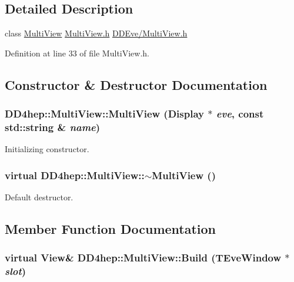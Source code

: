 \subsection{Detailed Description}
class \hyperlink{class_d_d4hep_1_1_multi_view}{MultiView} \hyperlink{_multi_view_8h}{MultiView.h} \hyperlink{_multi_view_8h}{DDEve/MultiView.h} 

Definition at line 33 of file MultiView.h.

\subsection{Constructor \& Destructor Documentation}
\hypertarget{class_d_d4hep_1_1_multi_view_a74b3e2c9a7bb1fb4da01630922325a34}{
\subsubsection[{MultiView}]{\setlength{\rightskip}{0pt plus 5cm}DD4hep::MultiView::MultiView ({\bf Display} $\ast$ {\em eve}, \/  const std::string \& {\em name})}}
\label{class_d_d4hep_1_1_multi_view_a74b3e2c9a7bb1fb4da01630922325a34}


Initializing constructor. \hypertarget{class_d_d4hep_1_1_multi_view_aa9f47e52d36461b82c352b9cb3949ada}{
\subsubsection[{$\sim$MultiView}]{\setlength{\rightskip}{0pt plus 5cm}virtual DD4hep::MultiView::$\sim$MultiView ()}}
\label{class_d_d4hep_1_1_multi_view_aa9f47e52d36461b82c352b9cb3949ada}


Default destructor. 

\subsection{Member Function Documentation}
\hypertarget{class_d_d4hep_1_1_multi_view_a979d39b6332fa3a647a12d982a4f74fb}{
\subsubsection[{Build}]{\setlength{\rightskip}{0pt plus 5cm}virtual {\bf View}\& DD4hep::MultiView::Build (TEveWindow $\ast$ {\em slot})}}
\label{class_d_d4hep_1_1_multi_view_a979d39b6332fa3a647a12d982a4f74fb}


